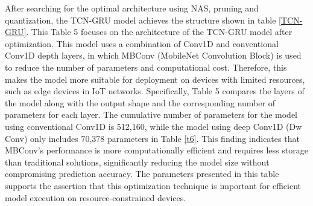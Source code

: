 \documentclass[sn-mathphys-num]{sn-jnl}%
\begin{document}
\begin{table}[ht!]
    \centering
    \caption{TCN-GRU Model Architecture}
    \label{TCN-GRU}
\end{table}

After searching for the optimal architecture using NAS, pruning and quantization, the TCN-GRU model achieves the structure shown in table \ref{TCN-GRU}. This Table 5 focuses on the architecture of the TCN-GRU model after optimization. This model uses a combination of Conv1D and conventional Conv1D depth layers, in which MBConv (MobileNet Convolution Block) is used to reduce the number of parameters and computational cost. Therefore, this makes the model more suitable for deployment on devices with limited resources, such as edge devices in IoT networks. Specifically, Table 5 compares the layers of the model along with the output shape and the corresponding number of parameters for each layer. The cumulative number of parameters for the model using conventional Conv1D is 512,160, while the model using deep Conv1D (Dw Conv) only includes 70,378 parameters in Table \ref{t6}. This finding indicates that MBConv’s performance is more computationally efficient and requires less storage than traditional solutions, significantly reducing the model size without compromising prediction accuracy. The parameters presented in this table supports the assertion that this optimization technique is important for efficient model execution on resource-constrained devices.
\end{document}
